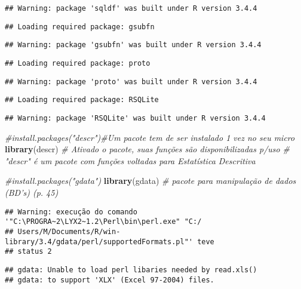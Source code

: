 \documentclass[]{article}
\newenvironment{Shaded}{\begin{snugshade}}{\end{snugshade}}
\newcommand{\KeywordTok}[1]{\textcolor[rgb]{0.13,0.29,0.53}{\textbf{#1}}}
\newcommand{\CommentTok}[1]{\textcolor[rgb]{0.56,0.35,0.01}{\textit{#1}}}
\newcommand{\NormalTok}[1]{#1}
\begin{document}
\begin{verbatim}
## Warning: package 'sqldf' was built under R version 3.4.4
\end{verbatim}

\begin{verbatim}
## Loading required package: gsubfn
\end{verbatim}

\begin{verbatim}
## Warning: package 'gsubfn' was built under R version 3.4.4
\end{verbatim}

\begin{verbatim}
## Loading required package: proto
\end{verbatim}

\begin{verbatim}
## Warning: package 'proto' was built under R version 3.4.4
\end{verbatim}

\begin{verbatim}
## Loading required package: RSQLite
\end{verbatim}

\begin{verbatim}
## Warning: package 'RSQLite' was built under R version 3.4.4
\end{verbatim}

\begin{Shaded}
\begin{Highlighting}[]
\CommentTok{#install.packages("descr")#Um pacote tem de ser instalado 1 vez no seu micro}
\KeywordTok{library}\NormalTok{(descr) }\CommentTok{# Ativado o pacote, suas funções são disponibilizadas p/uso}
\CommentTok{# "descr" é um pacote com funções voltadas para Estatística Descritiva}

\CommentTok{#install.packages("gdata")}
\KeywordTok{library}\NormalTok{(gdata) }\CommentTok{# pacote para manipulação de dados (BD's) (p. 45)}
\end{Highlighting}
\end{Shaded}

\begin{verbatim}
## Warning: execução do comando '"C:\PROGRA~2\LYX2~1.2\Perl\bin\perl.exe" "C:/
## Users/M/Documents/R/win-library/3.4/gdata/perl/supportedFormats.pl"' teve
## status 2
\end{verbatim}

\begin{verbatim}
## gdata: Unable to load perl libaries needed by read.xls()
## gdata: to support 'XLX' (Excel 97-2004) files.
\end{verbatim}
\end{document}
